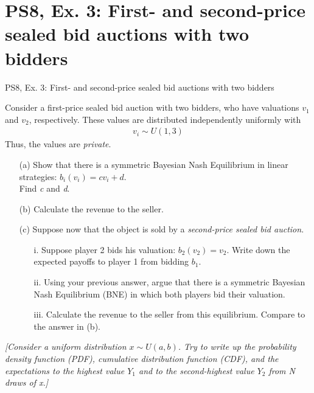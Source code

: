 \section{PS8, Ex. 3: First- and second-price sealed bid auctions with two bidders}

\begin{frame}{PS8, Ex. 3: First- and second-price sealed bid auctions with two bidders}
    \begin{multicols}{2}
      Consider a first-price sealed bid auction with two bidders, who have valuations $v_1$ and $v_2$, respectively. These values are distributed independently uniformly with
      \begin{align*}
        v_i\sim U(1,3)
      \end{align*}
      Thus, the values are \textit{private}.
      \begin{itemize}
        \item[(a)] Show that there is a symmetric Bayesian Nash Equilibrium in linear strategies: $b_i(v_i) = cv_i + d$.\\
                   Find \textit{c} and \textit{d}.
        \item[(b)] Calculate the revenue to the seller.
      \end{itemize}
      \vfill\null\columnbreak
      \begin{itemize}
        \item[(c)] Suppose now that the object is sold by a \textit{second-price sealed bid auction}.
        \begin{itemize}\normalsize
          \item[i.]   Suppose player 2 bids his valuation: $b_2(v_2) = v_2$. Write down the expected payoffs to player 1 from bidding $b_1$.
          \item[ii.]  Using your previous answer, argue that there is a symmetric Bayesian Nash Equilibrium (BNE) in which both players bid their valuation.
          \item[iii.] Calculate the revenue to the seller from this equilibrium. Compare to the answer in (b).
        \end{itemize}
      \end{itemize}
      \vfill\null
    \end{multicols}
    \vspace{-8pt}
    \textit{[Consider a uniform distribution $x\sim U(a, b)$. Try to write up the probability density function (PDF), cumulative distribution function (CDF), and the expectations to the highest value $Y_1$ and to the second-highest value $Y_2$ from N draws of x.]}
\end{frame}
